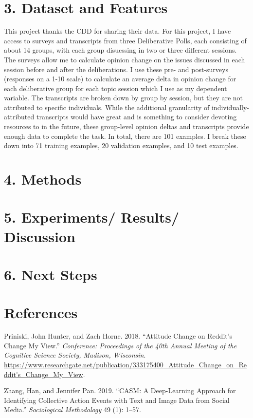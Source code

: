 \documentclass[11pt,]{article}
\begin{document}
\hypertarget{dataset-and-features}{%
\section{3. Dataset and Features}\label{dataset-and-features}}

This project thanks the CDD for sharing their data. For this project, I
have access to surveys and transcripts from three Deliberative Polls,
each consisting of about 14 groups, with each group disucssing in two or
three different sessions. The surveys allow me to calculate opinion
change on the issues discussed in each session before and after the
deliberations. I use these pre- and post-surveys (responses on a 1-10
scale) to calculate an average delta in opinion change for each
deliberative group for each topic session which I use as my dependent
variable. The transcripts are broken down by group by session, but they
are not attributed to specific individuals. While the additional
granularity of individually-attributed transcripts would have great and
is something to consider devoting resources to in the future, these
group-level opinion deltas and transcripts provide enough data to
complete the task. In total, there are 101 examples. I break these down
into 71 training examples, 20 validation examples, and 10 test examples.

\hypertarget{methods}{%
\section{4. Methods}\label{methods}}

\hypertarget{experiments-results-discussion}{%
\section{5. Experiments/ Results/
Discussion}\label{experiments-results-discussion}}

\hypertarget{next-steps}{%
\section{6. Next Steps}\label{next-steps}}

\hypertarget{references}{%
\section*{References}\label{references}}

\hypertarget{refs}{}
\leavevmode\hypertarget{ref-cmv}{}%
Priniski, John Hunter, and Zach Horne. 2018. ``Attitude Change on
Reddit's Change My View.'' \emph{Conference: Proceedings of the 40th
Annual Meeting of the Cognitiee Science Society, Madison, Wisconsin}.
\url{https://www.researchgate.net/publication/333175400_Attitude_Change_on_Reddit's_Change_My_View}.

\leavevmode\hypertarget{ref-zhang}{}%
Zhang, Han, and Jennifer Pan. 2019. ``CASM: A Deep-Learning Approach for
Identifying Collective Action Events with Text and Image Data from
Social Media.'' \emph{Sociological Methodology} 49 (1): 1--57.





\newpage
\singlespacing 
\end{document}
